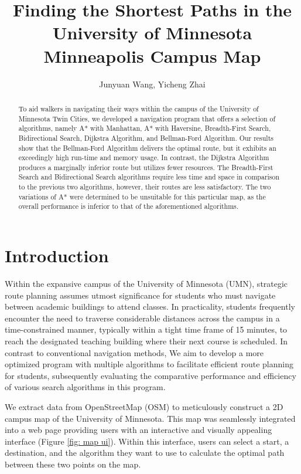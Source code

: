 \documentclass[12pt]{article}
\title{Finding the Shortest Paths in the University of Minnesota Minneapolis Campus Map}
\author{Junyuan Wang, Yicheng Zhai}
\begin{document}
\maketitle

\begin{abstract}
To aid walkers in navigating their ways within the campus of the University of Minnesota Twin Cities, we developed a navigation program that offers a selection of algorithms, namely A* with Manhattan, A* with Haversine, Breadth-First Search, Bidirectional Search, Dijkstra Algorithm, and Bellman-Ford Algorithm. Our results show that the Bellman-Ford Algorithm delivers the optimal route, but it exhibits an exceedingly high run-time and memory usage. In contrast, the Dijkstra Algorithm produces a marginally inferior route but utilizes fewer resources. The Breadth-First Search and Bidirectional Search algorithms require less time and space in comparison to the previous two algorithms, however, their routes are less satisfactory. The two variations of A* were determined to be unsuitable for this particular map, as the overall performance is inferior to that of the aforementioned algorithms. 
\end{abstract}


\section{Introduction}

Within the expansive campus of the University of Minnesota (UMN), strategic route planning assumes utmost significance for students who must navigate between academic buildings to attend classes. In practicality, students frequently encounter the need to traverse considerable distances across the campus in a time-constrained manner, typically within a tight time frame of 15 minutes, to reach the designated teaching building where their next course is scheduled. In contrast to conventional navigation methods, We aim to develop a more optimized program with multiple algorithms to facilitate efficient route planning for students, subsequently evaluating the comparative performance and efficiency of various search algorithms in this program.

We extract data from OpenStreetMap (OSM) to meticulously construct a 2D campus map of the University of Minnesota. This map was seamlessly integrated into a web page providing users with an interactive and visually appealing interface (Figure \ref{fig: map ui}). Within this interface, users can select a start, a destination, and the algorithm they want to use to calculate the optimal path between these two points on the map.
\end{document}
